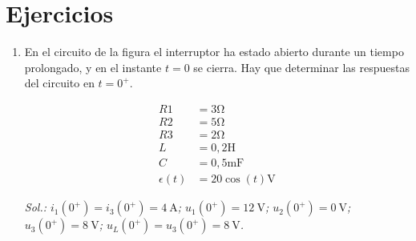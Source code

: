 \section*{Ejercicios}

\begin{enumerate}

\item En el circuito de la figura el interruptor ha estado abierto
  durante un tiempo prolongado, y en el instante $t = 0$ se
  cierra. Hay que determinar las respuestas del circuito en $t = 0^+$.

\begin{minipage}{0.5\linewidth}
\end{minipage}
\begin{minipage}{0.5\linewidth}
  \begin{align*}
    R1 &= 3\unit{\ohm}\\
    R2 &= 5\unit{\ohm}\\
    R3 &= 2\unit{\ohm}\\
    L &= 0,2\unit{\henry}\\
    C &= 0,5\unit{\milli\farad}\\
    \epsilon(t) &= 20\cos(t)\unit{\volt}
  \end{align*}
\end{minipage}

\emph{Sol.:   $i_1(0^+) = i_3(0^+) = \qty{4}{\ampere}$; 
  $u_1(0^+) = \qty{12}{\volt}$;
  $u_2(0^+) = \qty{0}{\volt}$;
  $u_3(0^+) = \qty{8}{\volt}$;
  $u_L(0^+) = u_3(0^+) = \qty{8}{\volt}$.
}


\end{enumerate}
